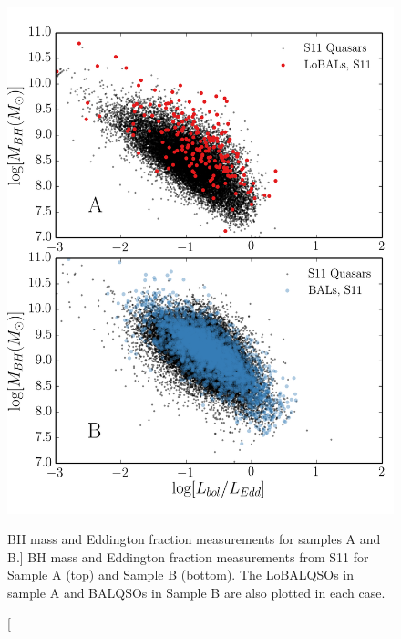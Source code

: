 \begin{figure} %
\centering
\includegraphics[width=1.0\textwidth]{figures/ewpaper/bals_2x2_scatter.png}
\caption
[BH mass and Eddington fraction measurements for samples A and B.]
{
BH mass and Eddington fraction measurements from S11 for Sample A (top)
and Sample B (bottom). The LoBALQSOs in sample A and BALQSOs in Sample B are
also plotted in each case.
}
\label{fig:bal_scatter}
\end{figure} %

